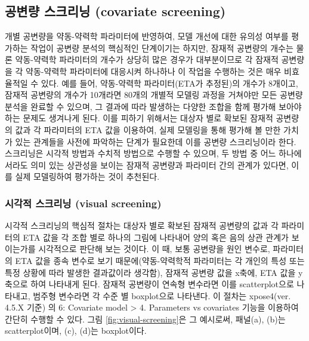 \documentclass[
  10pt,
  krantz2,
  a4paper]{krantz}
\theoremstyle{definition}
\theoremstyle{definition}
\theoremstyle{definition}
\theoremstyle{remark}
\begin{document}
\hypertarget{cov-screening}{%
\subsection{공변량 스크리닝 (covariate screening)}\label{cov-screening}}

개별 공변량을 약동-약력학 파라미터에 반영하여, 모델 개선에 대한 유의성 여부를 평가하는 작업이 공변량 분석의 핵심적인 단계이기는 하지만, 잠재적 공변량의 개수는 물론 약동-약력학 파라미터의 개수가 상당히 많은 경우가 대부분이므로 각 잠재적 공변량을 각 약동-약력학 파라미터에 대응시켜 하나하나 이 작업을 수행하는 것은 매우 비효율적일 수 있다. 예를 들어, 약동-약력학 파라미터(ETA가 추정된)의 개수가 8개이고, 잠재적 공변량의 개수가 10개라면 80개의 개별적 모델링 과정을 거쳐야만 모든 공변량 분석을 완료할 수 있으며, 그 결과에 따라 발생하는 다양한 조합을 함께 평가해 보아야 하는 문제도 생겨나게 된다. 이를 피하기 위해서는 대상자 별로 확보된 잠재적 공변량의 값과 각 파라미터의 ETA 값을 이용하여, 실제 모델링을 통해 평가해 볼 만한 가치가 있는 관계들을 사전에 파악하는 단계가 필요한데 이를 공변량 스크리닝이라 한다. 스크리닝은 시각적 방법과 수치적 방법으로 수행할 수 있으며, 두 방법 중 어느 하나에서라도 의미 있는 상관성을 보이는 잠재적 공변량과 파라미터 간의 관계가 있다면, 이를 실제 모델링하여 평가하는 것이 추천된다.

\hypertarget{uxc2dcuxac01uxc801-uxc2a4uxd06cuxb9acuxb2dd-visual-screening}{%
\subsubsection{시각적 스크리닝 (visual screening)}\label{uxc2dcuxac01uxc801-uxc2a4uxd06cuxb9acuxb2dd-visual-screening}}


시각적 스크리닝의 핵심적 절차는 대상자 별로 확보된 잠재적 공변량의 값과 각 파라미터의 ETA 값을 각 조합 별로 하나의 그림에 나타내어 양의 혹은 음의 상관 관계가 보이는가를 시각적으로 판단해 보는 것이다. 이 때, 보통 공변량을 원인 변수로, 파라미터의 ETA 값을 종속 변수로 보기 때문에(약동-약력학적 파라미터는 각 개인의 특성 또는 특정 상황에 따라 발생한 결과값이라 생각함), 잠재적 공변량 값을 x축에, ETA 값을 y축으로 하여 나타내게 된다. 잠재적 공변량이 연속형 변수라면 이를 scatterplot으로 나타내고, 범주형 변수라면 각 수준 별 boxplot으로 나타낸다. 이 절차는 xpose4(ver. 4.5.X 기준) 의 6: Covariate model \textgreater{} 4. Parameters vs covariates 기능을 이용하여 간단히 수행할 수 있다. 그림 \ref{fig:visual-screening}은 그 예시로써, 패널(a), (b)는 scatterplot이며, (c), (d)는 boxplot이다.
\end{document}
